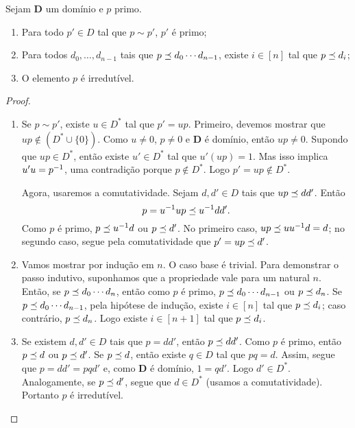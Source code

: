 \begin{proposition}
Sejam $\bm D$ um domínio e $p$ primo.
	\begin{enumerate}
	\item Para todo $p' \in D$ tal que $p \sim p'$, $p'$ é primo;
	\item Para todos $d_0,\ldots,d_{n-1}$ tais que $p \preceq d_0 \cdots d_{n-1}$, existe $i \in [n]$ tal que $p \preceq d_i$;
	\item O elemento $p$ é irredutível.
	\end{enumerate}
\end{proposition}
\begin{proof}
	\begin{enumerate}
	\item Se $p \sim p'$, existe $u \in D^*$ tal que $p'=up$. Primeiro, devemos mostrar que $up \notin (D^* \cup \{0\})$. Como $u \neq 0$, $p \neq 0$ e $\bm D$ é domínio, então $up \neq 0$. Supondo que $up \in D^*$, então existe $u' \in D^*$ tal que $u'(up)=1$. Mas isso implica $u'u=p^{-1}$, uma contradição porque $p \notin D^*$. Logo $p'=up \notin D^*$.
	
Agora, usaremos a comutatividade. Sejam $d,d' \in D$ tais que $up \preceq dd'$. Então
	\begin{equation*}
	p = u^{-1} up \preceq u^{-1} dd'.
	\end{equation*}
Como $p$ é primo, $p \preceq u^{-1} d$ ou $p \preceq d'$. No primeiro caso, $up \preceq uu^{-1} d=d$; no segundo caso, segue pela comutatividade que $p'=up \preceq d'$.
	
	\item Vamos mostrar por indução em $n$. O caso base é trivial. Para demonstrar o passo indutivo, suponhamos que a propriedade vale para um natural $n$. Então, se $p \preceq d_0 \cdots d_n$, então como $p$ é primo, $p \preceq d_0 \cdots d_{n-1}$ ou $p \preceq d_n$. Se $p \preceq d_0 \cdots d_{n-1}$, pela hipótese de indução, existe $i \in [n]$ tal que $p \preceq d_i$; caso contrário, $p \preceq d_n$. Logo existe $i \in [n+1]$ tal que $p \preceq d_i$.
	
	\item Se existem $d,d' \in D$ tais que $p=dd'$, então $p \preceq dd'$. Como $p$ é primo, então $p \preceq d$ ou $p \preceq d'$. Se $p \preceq d$, então existe $q \in D$ tal que $pq=d$. Assim, segue que $p=dd'=pqd'$ e, como $\bm D$ é domínio, $1=qd'$. Logo $d' \in D^*$. Analogamente, se $p \preceq d'$, segue que $d \in D^*$ (usamos a comutatividade). Portanto $p$ é irredutível.
	\end{enumerate}
\end{proof}

